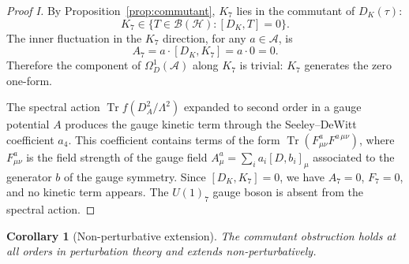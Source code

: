 \documentclass[12pt]{article}
\newtheorem{corollary}[theorem]{Corollary}
\theoremstyle{definition}
\theoremstyle{remark}
\newcommand{\Hil}{\mathcal{H}}
\newcommand{\Alg}{\mathcal{A}}
\newcommand{\Tr}{\operatorname{Tr}}
\begin{document}
\begin{proof}[Proof I]
By Proposition~\ref{prop:commutant}, $K_7$ lies in the commutant of $D_K(\tau)$:
\[
  K_7 \in \{T \in \mathcal{B}(\Hil) : [D_K, T] = 0\}.
\]
The inner fluctuation in the $K_7$ direction, for any $a \in \Alg$, is
\begin{equation}\label{eq:trivialoneform}
  A_7 = a \cdot [D_K, K_7] = a \cdot 0 = 0.
\end{equation}
Therefore the component of $\Omega^1_D(\Alg)$ along $K_7$ is trivial: $K_7$ generates the zero one-form.

The spectral action $\Tr f(D_A^2/\Lambda^2)$ expanded to second order in a gauge potential $A$ produces the gauge kinetic term through the Seeley--DeWitt coefficient $a_4$.  This coefficient contains terms of the form $\Tr(F_{\mu\nu}^a F^{a\,\mu\nu})$, where $F^a_{\mu\nu}$ is the field strength of the gauge field $A^a_\mu = \sum_i a_i [D, b_i]_\mu$ associated to the generator $b$ of the gauge symmetry.  Since $[D_K, K_7] = 0$, we have $A_7 = 0$, $F_7 = 0$, and no kinetic term appears.  The $U(1)_7$ gauge boson is absent from the spectral action.
\end{proof}

\begin{corollary}[Non-perturbative extension]\label{cor:allorders}
The commutant obstruction holds at all orders in perturbation theory and extends non-perturbatively.
\end{corollary}
\end{document}
